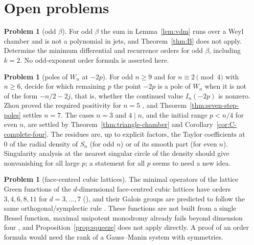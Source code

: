 \documentclass[11pt]{amsart}
\theoremstyle{definition}
\newtheorem{problem}[thm]{Problem}
\begin{document}
\section{Open problems}\label{sec:open}

\begin{problem}[odd $\beta$]
For odd $\beta$ the sum in Lemma~\ref{lem:vdm} runs over a Weyl chamber and is not a polynomial in jets, and Theorem~\ref{thm:B} does not apply. Determine the minimum differential and recurrence orders for odd $\beta$, including $k=2$. No odd-exponent order formula is asserted here.
\end{problem}

\begin{problem}[poles of $W_n$ at $-2p$]
For odd $n\ge9$ and for $n\equiv2\pmod4$ with $n\ge6$, decide for which remaining $p$ the point $-2p$ is a pole of $W_n$ when it is not of the form $-n/2-2j$, that is, whether the continued value $I_n(-2p)$ is nonzero. Zhou proved the required positivity for $n=5$ \cite{Zho19}, and Theorem~\ref{thm:seven-step-poles} settles $n=7$. The cases $n=3$ and $4\mid n$, and the initial range $p<n/4$ for even $n$, are settled by Theorem~\ref{thm:triangle-chamber} and Corollary~\ref{cor:C-complete-four}. The residues are, up to explicit factors, the Taylor coefficients at $0$ of the radial density of $S_n$ (for odd $n$) or of its smooth part (for even $n$). Singularity analysis at the nearest singular circle of the density should give nonvanishing for all large $p$; a statement for all $p$ seems to need a new idea.
\end{problem}

\begin{problem}[face-centred cubic lattices]
The minimal operators of the lattice Green functions of the $d$-dimensional face-centred cubic lattices have orders $3,4,6,8,11$ for $d=3,\dots,7$ (\cite{Kou13,ZHM15}), and their Galois groups are predicted to follow the same orthogonal/symplectic rule \cite{HMZ25}. These functions are not built from a single Bessel function, maximal unipotent monodromy already fails beyond dimension four \cite{HMZ25}, and Proposition~\ref{prop:squeeze} does not apply directly. A proof of an order formula would need the rank of a Gauss--Manin system with symmetries.
\end{problem}
\end{document}
